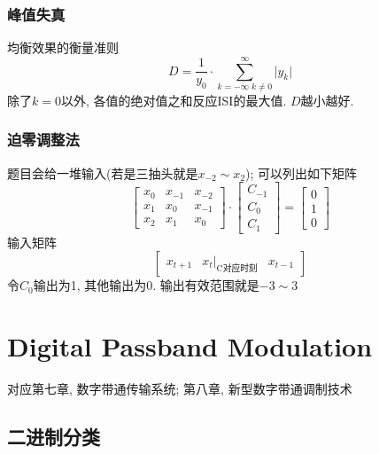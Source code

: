 \documentclass[a4paper]{report}
\begin{document}
\subsection{峰值失真}
均衡效果的衡量准则
\begin{equation}
  D=\frac{1}{y_0}\cdot \displaystyle\sum_{k=-\infty \; k\neq 0}^{\infty}\lvert y_k \rvert
\end{equation}
除了$k=0$以外, 各值的绝对值之和反应ISI的最大值. $D$越小越好. 
\subsection{迫零调整法}
题目会给一堆输入(若是三抽头就是$x_{-2}\sim x_{2}$); 可以列出如下矩阵
\begin{equation}
  \begin{bmatrix}
    x_0&x_{-1}&x_{-2}
    \\ x_1&x_{0}&x_{-1}
    \\ x_2&x_1&x_0
  \end{bmatrix}\cdot \begin{bmatrix}
    C_{-1}
    \\ C_0
    \\ C_1
  \end{bmatrix}=
  \begin{bmatrix}
    0
    \\ 1
    \\ 0
  \end{bmatrix}
\end{equation}
输入矩阵
\begin{equation}
  \begin{bmatrix}
    x_{t+1}&x_{t}\rvert_{\text{C对应时刻}}&x_{t-1}
  \end{bmatrix}
\end{equation}
令$C_0$输出为1, 其他输出为0. 输出有效范围就是$-3\sim 3$
\chapter{Digital Passband Modulation}
对应第七章, 数字带通传输系统; 第八章, 新型数字带通调制技术
\section{二进制分类}
\end{document}
